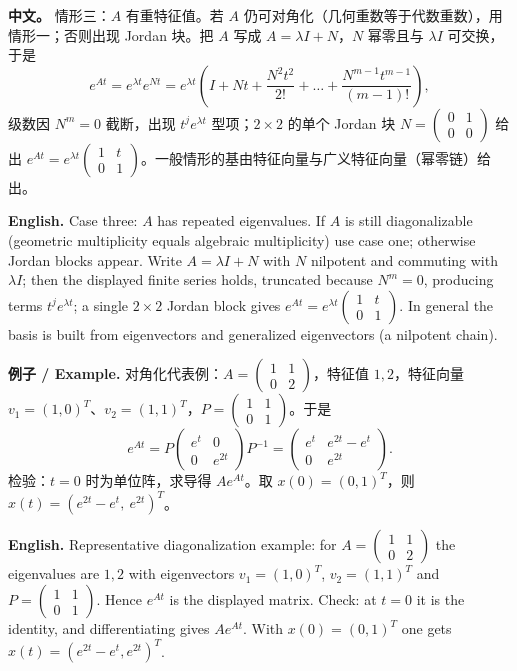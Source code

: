 \documentclass[UTF8,11pt,a4paper]{ctexart}
\newcommand{\APS}[2]{\par\noindent\textbf{中文。} #1\par\noindent\textbf{English.} #2\par}
\newcommand{\EN}[1]{\par\noindent \textbf{English.} #1\par}
\newcommand{\EX}[2]{\par\noindent \textbf{例子 / Example.} #1\par\EN{#2}}
\begin{document}
\APS{情形三：$A$ 有重特征值。若 $A$ 仍可对角化（几何重数等于代数重数），用情形一；否则出现 Jordan 块。把 $A$ 写成 $A=\lambda I+N$，$N$ 幂零且与 $\lambda I$ 可交换，于是
\[
e^{At}=e^{\lambda t}e^{Nt}=e^{\lambda t}\left(I+Nt+\frac{N^2t^2}{2!}+\dots+\frac{N^{m-1}t^{m-1}}{(m-1)!}\right),
\]
级数因 $N^m=0$ 截断，出现 $t^je^{\lambda t}$ 型项；$2\times2$ 的单个 Jordan 块 $N=\begin{pmatrix}0&1\\0&0\end{pmatrix}$ 给出 $e^{At}=e^{\lambda t}\begin{pmatrix}1&t\\0&1\end{pmatrix}$。一般情形的基由特征向量与广义特征向量（幂零链）给出。}{Case three: $A$ has repeated eigenvalues. If $A$ is still diagonalizable (geometric multiplicity equals algebraic multiplicity) use case one; otherwise Jordan blocks appear. Write $A=\lambda I+N$ with $N$ nilpotent and commuting with $\lambda I$; then the displayed finite series holds, truncated because $N^m=0$, producing terms $t^je^{\lambda t}$; a single $2\times2$ Jordan block gives $e^{At}=e^{\lambda t}\begin{pmatrix}1&t\\0&1\end{pmatrix}$. In general the basis is built from eigenvectors and generalized eigenvectors (a nilpotent chain).}
\EX{对角化代表例：$A=\begin{pmatrix}1&1\\0&2\end{pmatrix}$，特征值 $1,2$，特征向量 $v_1=(1,0)^T$、$v_2=(1,1)^T$，$P=\begin{pmatrix}1&1\\0&1\end{pmatrix}$。于是
\[
e^{At}=P\begin{pmatrix}e^{t}&0\\0&e^{2t}\end{pmatrix}P^{-1}
=\begin{pmatrix}e^{t}&e^{2t}-e^{t}\\0&e^{2t}\end{pmatrix}.
\]
检验：$t=0$ 时为单位阵，求导得 $Ae^{At}$。取 $x(0)=(0,1)^T$，则 $x(t)=(e^{2t}-e^t,\ e^{2t})^T$。}{Representative diagonalization example: for $A=\begin{pmatrix}1&1\\0&2\end{pmatrix}$ the eigenvalues are $1,2$ with eigenvectors $v_1=(1,0)^T$, $v_2=(1,1)^T$ and $P=\begin{pmatrix}1&1\\0&1\end{pmatrix}$. Hence $e^{At}$ is the displayed matrix. Check: at $t=0$ it is the identity, and differentiating gives $Ae^{At}$. With $x(0)=(0,1)^T$ one gets $x(t)=(e^{2t}-e^t,e^{2t})^T$.}
\end{document}
